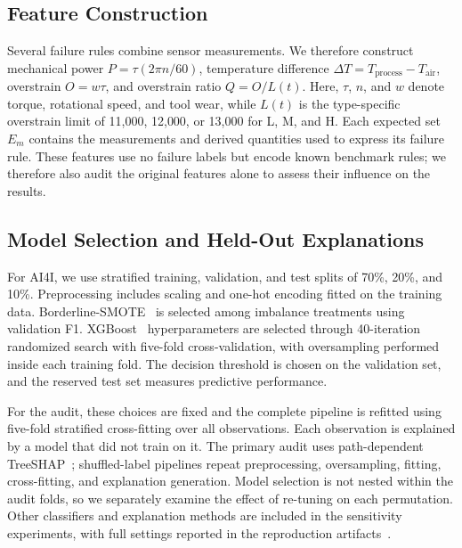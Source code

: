 \documentclass[conference]{IEEEtran}
\begin{document}
\subsection{Feature Construction}
\label{sec:features}

Several failure rules combine sensor measurements. We therefore construct mechanical power $P=\tau(2\pi n/60)$, temperature difference $\Delta T=T_{\mathrm{process}}-T_{\mathrm{air}}$, overstrain $O=w\tau$, and overstrain ratio $Q=O/L(t)$. Here, $\tau$, $n$, and $w$ denote torque, rotational speed, and tool wear, while $L(t)$ is the type-specific overstrain limit of 11{,}000, 12{,}000, or 13{,}000 for L, M, and H. Each expected set $E_m$ contains the measurements and derived quantities used to express its failure rule. These features use no failure labels but encode known benchmark rules; we therefore also audit the original features alone to assess their influence on the results.


\subsection{Model Selection and Held-Out Explanations}
\label{sec:training}

For AI4I, we use stratified training, validation, and test splits of 70\%, 20\%, and 10\%. Preprocessing includes scaling and one-hot encoding fitted on the training data. Borderline-SMOTE~\cite{han2005borderline} is selected among imbalance treatments using validation F1. XGBoost~\cite{chen2016xgboost} hyperparameters are selected through 40-iteration randomized search with five-fold cross-validation, with oversampling performed inside each training fold. The decision threshold is chosen on the validation set, and the reserved test set measures predictive performance.

For the audit, these choices are fixed and the complete pipeline is refitted using five-fold stratified cross-fitting over all observations. Each observation is explained by a model that did not train on it. The primary audit uses path-dependent TreeSHAP~\cite{lundberg2020treeshap}; shuffled-label pipelines repeat preprocessing, oversampling, fitting, cross-fitting, and explanation generation. Model selection is not nested within the audit folds, so we separately examine the effect of re-tuning on each permutation. Other classifiers and explanation methods are included in the sensitivity experiments, with full settings reported in the reproduction artifacts~\cite{artifact}.
\end{document}
